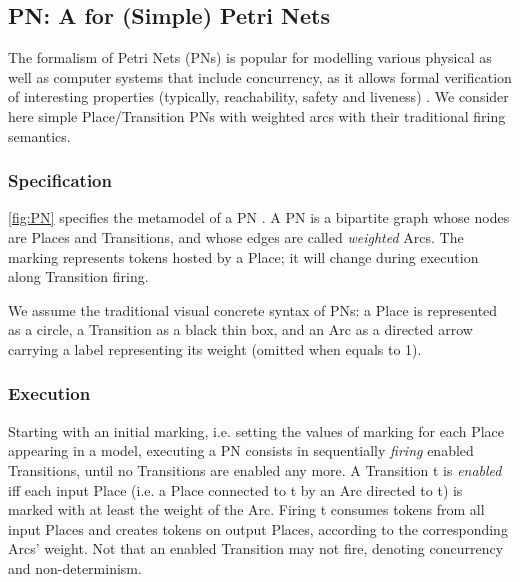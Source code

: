 \subsection{\textsf{PN}: A \DSL for (Simple) Petri Nets}
\label{sec:Examples:PN}

The formalism of Petri Nets (PNs) is popular for modelling various physical as well as
computer systems that include concurrency, as it allows formal verification of 
interesting properties (typically, reachability, safety and liveness)
\cite{B:He-Murata:2005}. We consider here simple Place/Transition PNs with weighted
arcs with their traditional firing semantics. 

\subsubsection{Specification}
\label{sec:Examples:PN:Specification}

\autoref{fig:PN} specifies the metamodel of a PN \DSL. A \textsf{PN} is a bipartite
graph whose nodes are \textsf{Place}s and \textsf{Transition}s, and whose edges are
called \emph{weighted} \textsf{Arc}s. The \textsf{marking} represents tokens hosted
by a \textsf{Place}; it will change during execution along \textsf{Transition} firing.
 
We assume the traditional visual concrete syntax of PNs: a \textsf{Place} is 
represented as a circle, a \textsf{Transition} as a black thin box, and an 
\textsf{Arc} as a directed arrow carrying a label representing its \textsf{weight}
(omitted when equals to 1).

\subsubsection{Execution}
\label{sec:Examples:PN:Execution}

Starting with an initial marking, i.e. setting the values of \textsf{marking} for
each \textsf{Place} appearing in a model, executing a \textsf{PN} consists in 
sequentially \emph{firing} enabled \textsf{Transition}s, until no 
\textsf{Transition}s are enabled any more. A \textsf{Transition} \textsf{t} is 
\emph{enabled} iff each input \textsf{Place} (i.e. a \textsf{Place} connected to
\textsf{t} by an \textsf{Arc} directed to \textsf{t}) is marked with at least the
weight of the \textsf{Arc}. Firing \textsf{t} consumes tokens from all input 
\textsf{Place}s and creates tokens on output \textsf{Place}s, according to the
corresponding \textsf{Arc}s' \textsf{weight}. Not that an enabled \textsf{Transition}
may not fire, denoting concurrency and non-determinism.

